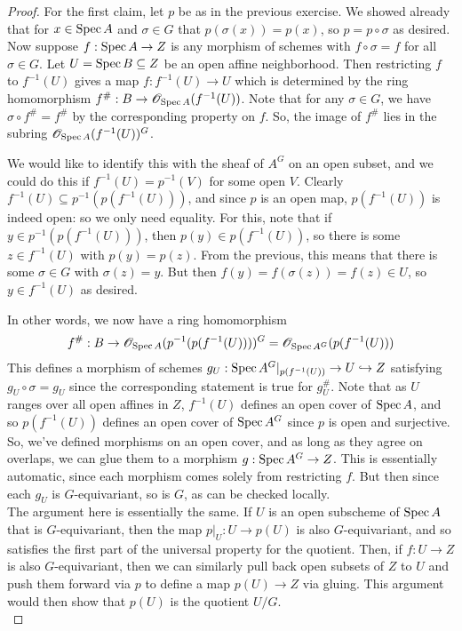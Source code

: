 \begin{proof}
	For the first claim, let $p$ be as in the previous exercise. We showed already that for $x \in \operatorname{Spec} A$ and $\sigma \in G$ that $p(\sigma(x)) = p(x)$, so $p = p \circ \sigma$ as desired. Now suppose $f : \operatorname{Spec} A \to Z$ is any morphism of schemes with $f \circ \sigma = f$ for all $\sigma \in G$. Let $U = \operatorname{Spec} B \subseteq Z$ be an open affine neighborhood. Then restricting $f$ to $f^{-1}(U)$ gives a map $f : f^{-1}(U) \to U$ which is determined by the ring homomorphism $f^\# : B \to \mathscr{O}_{\operatorname{Spec} A}(f^{-1}(U))$. Note that for any $\sigma \in G$, we have $\sigma \circ f^\# = f^\#$ by the corresponding property on $f$. So, the image of $f^\#$ lies in the subring $\mathscr{O}_{\operatorname{Spec} A}(f^{-1}(U))^G$.
	
	We would like to identify this with the sheaf of $A^G$ on an open subset, and we could do this if $f^{-1}(U) = p^{-1}(V)$ for some open $V$. Clearly $f^{-1}(U) \subseteq p^{-1}(p(f^{-1}(U)))$, and since $p$ is an open map, $p(f^{-1}(U))$ is indeed open: so we only need equality. For this, note that if $y \in p^{-1}(p(f^{-1}(U)))$, then $p(y) \in p(f^{-1}(U))$, so there is some $z \in f^{-1}(U)$ with $p(y) = p(z)$. From the previous, this means that there is some $\sigma \in G$ with $\sigma(z) = y$. But then $f(y) = f(\sigma(z)) = f(z) \in U$, so $y \in f^{-1}(U)$ as desired.
	
	In other words, we now have a ring homomorphism
	\[ f^\# : B \to \mathscr{O}_{\operatorname{Spec} A}(p^{-1}(p(f^{-1}(U))))^G = \mathscr{O}_{\operatorname{Spec} A^G}(p(f^{-1}(U))) \]
	This defines a morphism of schemes $g_U : \operatorname{Spec} A^G|_{p(f^{-1}(U))} \to U \hookrightarrow Z$ satisfying $g_U \circ \sigma = g_U$ since the corresponding statement is true for $g_U^\#$. Note that as $U$ ranges over all open affines in $Z$, $f^{-1}(U)$ defines an open cover of $\operatorname{Spec} A$, and so $p(f^{-1}(U))$ defines an open cover of $\operatorname{Spec} A^G$ since $p$ is open and surjective. So, we've defined morphisms on an open cover, and as long as they agree on overlaps, we can glue them to a morphism $g : \operatorname{Spec} A^G \to Z$. This is essentially automatic, since each morphism comes solely from restricting $f$. But then since each $g_U$ is $G$-equivariant, so is $G$, as can be checked locally. \\
	
	The argument here is essentially the same. If $U$ is an open subscheme of $\operatorname{Spec} A$ that is $G$-equivariant, then the map $p|_U : U \to p(U)$ is also $G$-equivariant, and so satisfies the first part of the universal property for the quotient. Then, if $f : U \to Z$ is also $G$-equivariant, then we can similarly pull back open subsets of $Z$ to $U$ and push them forward via $p$ to define a map $p(U) \to Z$ via gluing. This argument would then show that $p(U)$ is the quotient $U/G$. \\
	

\end{proof}
